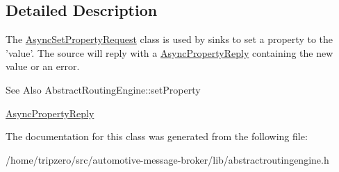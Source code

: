 \subsection{Detailed Description}
The \hyperlink{classAsyncSetPropertyRequest}{Async\-Set\-Property\-Request} class is used by sinks to set a property to the 'value'. The source will reply with a \hyperlink{classAsyncPropertyReply}{Async\-Property\-Reply} containing the new value or an error. 

\begin{DoxySeeAlso}{See Also}
Abstract\-Routing\-Engine\-::set\-Property 

\hyperlink{classAsyncPropertyReply}{Async\-Property\-Reply} 
\end{DoxySeeAlso}


The documentation for this class was generated from the following file\-:\begin{DoxyCompactItemize}
\item 
/home/tripzero/src/automotive-\/message-\/broker/lib/abstractroutingengine.\-h\end{DoxyCompactItemize}
